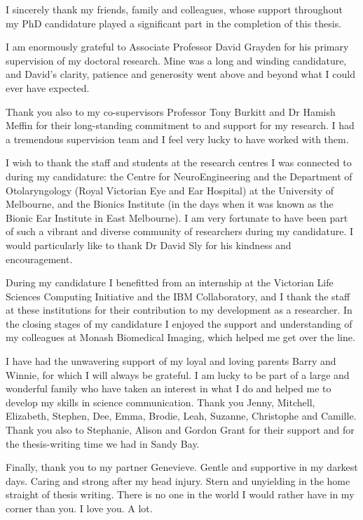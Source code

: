 
\begin{acknowledgements}

  I sincerely thank my friends, family and colleagues, whose support throughout
  my PhD candidature played a significant part in the completion of this thesis.

  I am enormously grateful to Associate Professor David Grayden for his primary
  supervision of my doctoral research. Mine was a long and winding candidature,
  and David's clarity, patience and generosity went above and beyond what I
  could ever have expected. 

  Thank you also to my co-supervisors Professor Tony Burkitt and Dr Hamish
  Meffin for their long-standing commitment to and support for my research. I
  had a tremendous supervision team and I feel very lucky to have worked with
  them.

  I wish to thank the staff and students at the research centres I was connected
  to during my candidature: the Centre for NeuroEngineering and the Department
  of Otolaryngology (Royal Victorian Eye and Ear Hospital) at the University of
  Melbourne, and the Bionics Institute (in the days when it was known as the
  Bionic Ear Institute in East Melbourne). I am very fortunate to have been part
  of such a vibrant and diverse community of researchers during my
  candidature. I would particularly like to thank Dr David Sly for his kindness
  and encouragement.

  During my candidature I benefitted from an internship at the Victorian Life
  Sciences Computing Initiative and the IBM Collaboratory, and I thank the staff
  at these institutions for their contribution to my development as a
  researcher. In the closing stages of my candidature I enjoyed the support and
  understanding of my colleagues at Monash Biomedical Imaging, which helped me
  get over the line.

  I have had the unwavering support of my loyal and loving parents Barry and
  Winnie, for which I will always be grateful. I am lucky to be part of a large
  and wonderful family who have taken an interest in what I do and helped me to
  develop my skills in science communication. Thank you Jenny, Mitchell,
  Elizabeth, Stephen, Dee, Emma, Brodie, Leah, Suzanne, Christophe and
  Camille. Thank you also to Stephanie, Alison and Gordon Grant for their
  support and for the thesis-writing time we had in Sandy Bay.

  Finally, thank you to my partner Genevieve. Gentle and supportive in my
  darkest days. Caring and strong after my head injury. Stern and unyielding in
  the home straight of thesis writing. There is no one in the world I would
  rather have in my corner than you. I love you. A lot.

\end{acknowledgements}
